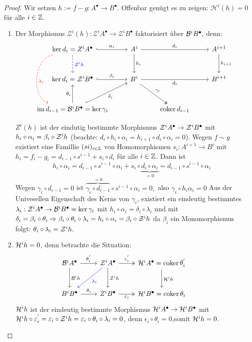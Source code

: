 \begin{proof}
	Wir setzen $h:= f-g: A^{\bullet} \to B^{\bullet} $. Offenbar genügt es zu zeigen: $\mathcal{H}^i(h) = 0 $ für alle $ i \in \mathbb{Z}$. 
	\begin{enumerate}
		\item Der Morphismus $ \mathcal{Z}^i(h): \mathcal{Z}^iA^{\bullet} \to \mathcal{Z}^iB^{\bullet} $ faktorisiert über $\mathcal{B}^iB^{\bullet},$ denn: \\
		$$\begin{tikzcd}[row sep = large]
		\ker d_i = Z^iA^{\bullet} \arrow[dashed, blue]{d}{\ZZ^ih} \arrow[hook]{r}{\alpha_i} \arrow[dashed,red, bend right = 75]{dd}{\lambda_i}& A^i \arrow{d}{h_i}\arrow{rr}{d_i} & & A^{i+1} \arrow{d}{h_{i+1}} \\
		\ker d_i =\ZZ^iB^{\bullet} \arrow[hook]{r}{\beta_i} & B^i \arrow[swap]{rr}{d_i}\arrow[two heads]{dr}{\gamma_i} & & B^{i+1}  \\
		\im d_{i-1} = \BB^iB^{\bullet} = \ker \gamma_i \arrow{u}{\theta_i} \arrow[swap, hook]{ur}{\delta_i} &  &\coker d_{i-1} &
		\end{tikzcd}$$
		
		$Z^i(h) $ ist der eindutig bestimmte Morphismus $ \mathcal{Z}^iA^{\bullet} \to \mathcal{Z}^iB^{\bullet} $ mit $h_i \circ \alpha_i = \beta_i \circ \mathcal{Z}^ih $ (beachte: $d_i \circ h_i \circ \alpha_i = h_{i+1} \circ d_i \circ \alpha_i = 0$). Wegen $ f \sim g $ existiert eine Famillie $(si)_{i \in \mathbb{Z}} $ von Homomorphismen $s_i: A^{i+1} \to B^i $ mit $ h_i=f_i -g_i = d_{i -1} \circ s^{i-1} + s_i \circ d_i $ für alle $i \in \mathbb{Z}$. Dann ist
		$$h_i \circ \alpha_i = d_{i-1} \circ s^{i-1} \circ \alpha_i + s_i \circ \underbrace{d_i \circ \alpha_i}_{=0} = d_{i-1} \circ s^{i-1} \circ \alpha_i$$ Wegen $ \gamma_i \circ d_{i-1}= 0 $ ist $ \overbrace{\gamma_i \circ d_{i-1}}^{=0} \circ s^{i-1} \circ \alpha_i = 0, $ also $ \gamma_i \circ h_i \alpha_i = 0$ Aus der Univesellen Eigenschaft des Kerns von $\gamma_i $, existiert ein eindeutig bestimmtes $ \lambda_i : \mathcal{Z}^iA^{\bullet} \to \mathcal{B}^iB^{\bullet} = \ker \gamma_i $ mit $ h_i \circ \alpha_i = \delta_i \circ \lambda_i $ und mit $\delta_i = \beta_i \circ \theta_i \Rightarrow \beta_i \circ \theta_i \circ \lambda_i = h_i \circ \alpha_i = \beta_i \circ \mathcal{Z}^ih $ da $\beta_i$ ein Monomorphismus folgt: $ \theta_i \circ \lambda_i = \mathcal{Z}^ih.$
		\item $\mathcal{H}^ih = 0$, denn betrachte die Situation:
		$$\begin{tikzcd}[row sep = large]
		\BB^iA^{\bullet} \arrow{d}{\BB^ih} \arrow{r}{\theta_i^{'}} & \ZZ^iA^{\bullet} \arrow{d}{\ZZ^ih} \arrow[blue]{dl}{\lambda_i} \arrow[two heads]{r}{\epsilon_i^{'}} & \HH^iA^{\bullet} = \coker \theta_i^{'} \arrow{d}{\HH^ih} & \\
		B^iB^{\bullet} \arrow{r}{\theta_i} & Z^iB^{\bullet} \arrow[swap, two heads]{r}{\epsilon_i} & \HH^iB^{\bullet} = \coker \theta_i& 
		\end{tikzcd}$$
		$\mathcal{H}^ih$ ist der eindeutig bestimmte Morphismus $\mathcal{H}^iA^{\bullet} \to \mathcal{H}^iB^{\bullet} $ mit $\mathcal{H}^ih \circ \varepsilon_i^{'} = \varepsilon_i \circ \mathcal{Z}^ih = \varepsilon_i \circ \theta_i \circ \lambda_i = 0$, denn $\epsilon_i \circ \theta_i =0 $,somit $\mathcal{H}^ih=0 $.
	\end{enumerate}
\end{proof}
